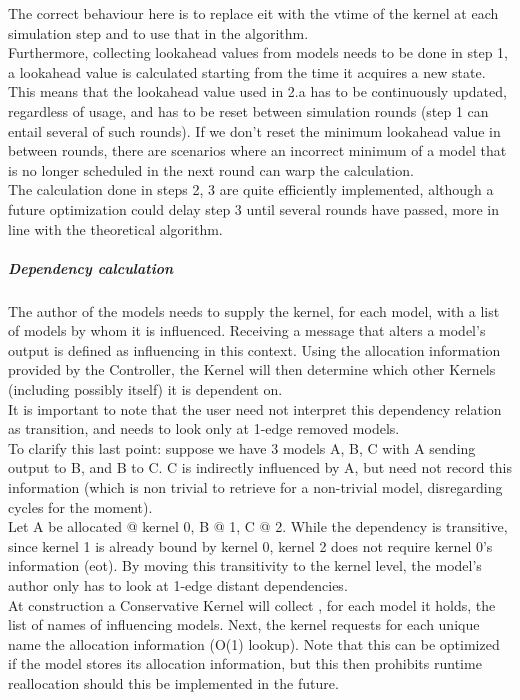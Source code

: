 \documentclass[8pt,a4paper]{report}
\begin{document}
The correct behaviour here is to replace eit with the vtime of the kernel at each simulation step and to use that in the algorithm.\\
 Furthermore, collecting lookahead values from models needs to be done in step 1, a lookahead value is calculated starting from the time it acquires a new state. This means that the lookahead value used in 2.a has to be continuously updated, regardless of usage, and has to be reset between simulation rounds (step 1 can entail several of such rounds). If we don't reset the minimum lookahead value in between rounds, there are scenarios where an incorrect minimum of a model that is no longer scheduled in the next round can warp the calculation. \\ 
 The calculation done in steps 2, 3 are quite efficiently implemented, although a future optimization could delay step 3 until several rounds have passed, more in line with the theoretical algorithm.
\subparagraph{Dependency calculation}
The author of the models needs to supply the kernel, for each model, with a list of models by whom it is influenced. Receiving a message that alters a model's output is defined as influencing in this context. Using the allocation information provided by the Controller, the Kernel will then determine which other Kernels (including possibly itself) it is dependent on.\\
It is important to note that the user need not interpret this dependency relation as transition, and needs to look only at 1-edge removed models. \\
To clarify this last point: suppose we have 3 models A, B, C with A sending output to B, and B to C. C is indirectly influenced by A, but need not record this information (which is non trivial to retrieve for a non-trivial model, disregarding cycles for the moment). \\
Let A be allocated @ kernel 0, B @ 1, C @ 2. While the dependency is transitive, since kernel 1 is already bound by kernel 0, kernel 2 does not require kernel 0's information (eot). By moving this transitivity to the kernel level, the model's author only has to look at 1-edge distant dependencies. \\
At construction a Conservative Kernel will collect , for each model it holds, the list of names of influencing models. Next, the kernel requests for each unique name the allocation information (O(1) lookup). Note that this can be optimized if the model stores its allocation information, but this then prohibits runtime reallocation should this be implemented in the future.
\end{document}
